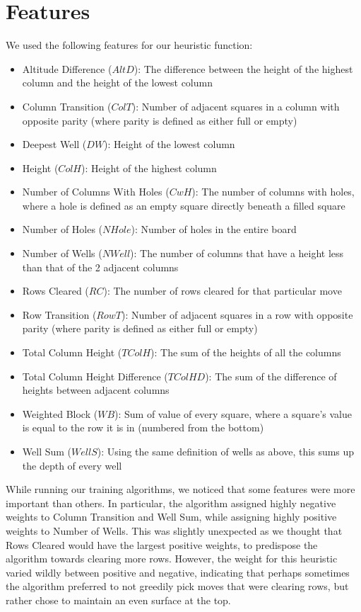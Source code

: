 \documentclass{article}
\begin{document}
    \section{Features}
    We used the following features for our heuristic function:
    \begin{itemize}
        \item Altitude Difference ($AltD$): The difference between the height of the highest
        column and the height of the lowest column
		\item Column Transition ($ColT$): Number of adjacent squares in a column with opposite parity (where parity is defined as either full or empty)
		\item Deepest Well ($DW$): Height of the lowest column
        \item Height ($ColH$): Height of the highest column
		\item Number of Columns With Holes ($CwH$): The number of columns with holes, where a hole
		is defined as an empty square directly beneath a filled square
        \item Number of Holes ($NHole$): Number of holes in the entire board
        \item Number of Wells ($NWell$): The number of columns that have a height less than that of the 2
        adjacent columns
		\item Rows Cleared ($RC$): The number of rows cleared for that particular move
		\item Row Transition ($RowT$): Number of adjacent squares in a row with opposite parity (where parity is defined as either full or empty)
        \item Total Column Height ($TColH$): The sum of the heights of all the columns
        \item Total Column Height Difference ($TColHD$): The sum of the difference of heights between adjacent columns
        \item Weighted Block ($WB$): Sum of value of every square, where a square's value is equal to
		the row it is in (numbered from the bottom)
        \item Well Sum ($WellS$): Using the same definition of wells as above, this sums up
		the depth of every well
    \end{itemize}

    While running our training algorithms, we noticed that some features were more
	important than others. In particular, the algorithm assigned highly negative
	weights to Column Transition and Well Sum, while assigning highly positive
	weights to Number of Wells. This was slightly unexpected as we thought that
	Rows Cleared would have the largest positive weights, to predispose the algorithm
	towards clearing more rows. However, the weight for this heuristic varied wildly
	between positive and negative, indicating that perhaps sometimes the algorithm
	preferred to not greedily pick moves that were clearing rows, but rather chose
	to maintain an even surface at the top.
\end{document}
